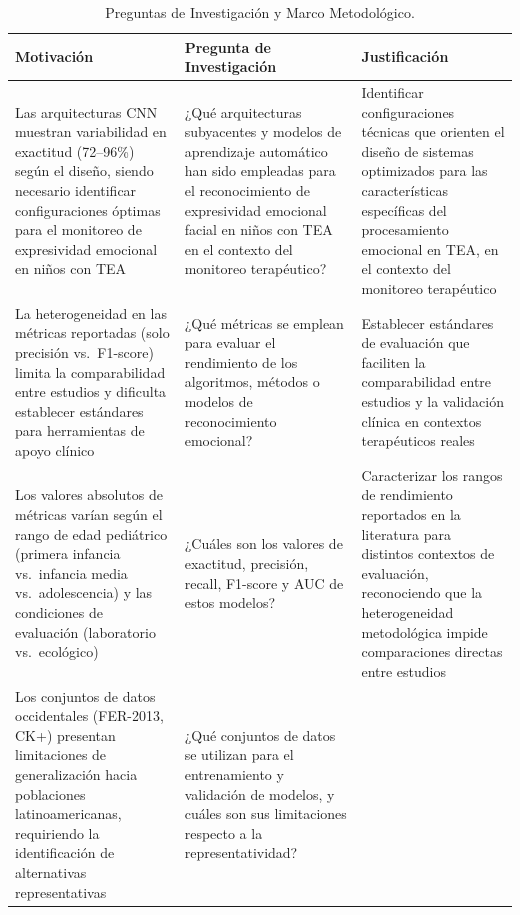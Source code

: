 \documentclass[ASNA,twocolumn]{USG}
\begin{document}
	\begin{table}[!t]
		\caption{Preguntas de Investigación y Marco Metodológico.\label{tab1}}
		{\setlength{\tabcolsep}{4pt}
			\begin{tabular*}{\textwidth}{@{\extracolsep\fill}lll@{\extracolsep\fill}}
				\toprule
				\textbf{Motivación} & \textbf{Pregunta de Investigación} & \textbf{Justificación} \\
				\midrule
				\parbox[t]{148pt}{Las arquitecturas CNN muestran variabilidad en exactitud (72--96\%) según el diseño, siendo necesario identificar configuraciones óptimas para el monitoreo de expresividad emocional en niños con TEA} &
				\parbox[t]{195pt}{¿Qué arquitecturas subyacentes y modelos de aprendizaje automático han sido empleadas para el reconocimiento de expresividad emocional facial en niños con TEA en el contexto del monitoreo terapéutico?} &
				\parbox[t]{148pt}{Identificar configuraciones técnicas que orienten el diseño de sistemas optimizados para las características específicas del procesamiento emocional en TEA, en el contexto del monitoreo terapéutico} \\[6pt]
				\parbox[t]{148pt}{La heterogeneidad en las métricas reportadas (solo precisión vs.\ F1-score) limita la comparabilidad entre estudios y dificulta establecer estándares para herramientas de apoyo clínico} &
				\parbox[t]{195pt}{¿Qué métricas se emplean para evaluar el rendimiento de los algoritmos, métodos o modelos de reconocimiento emocional?} &
				\parbox[t]{148pt}{Establecer estándares de evaluación que faciliten la comparabilidad entre estudios y la validación clínica en contextos terapéuticos reales} \\[6pt]
				\parbox[t]{148pt}{Los valores absolutos de métricas varían según el rango de edad pediátrico (primera infancia vs.\ infancia media vs.\ adolescencia) y las condiciones de evaluación (laboratorio vs.\ ecológico)} &
				\parbox[t]{195pt}{¿Cuáles son los valores de exactitud, precisión, recall, F1-score y AUC de estos modelos?} &
				\parbox[t]{148pt}{Caracterizar los rangos de rendimiento reportados en la literatura para distintos contextos de evaluación, reconociendo que la heterogeneidad metodológica impide comparaciones directas entre estudios} \\[6pt]
				\parbox[t]{148pt}{Los conjuntos de datos occidentales (FER-2013, CK+) presentan limitaciones de generalización hacia poblaciones latinoamericanas, requiriendo la identificación de alternativas representativas} &
				\parbox[t]{195pt}{¿Qué conjuntos de datos se utilizan para el entrenamiento y validación de modelos, y cuáles son sus limitaciones respecto a la representatividad?} &

\end{tabular*}}
\end{table}
\end{document}
